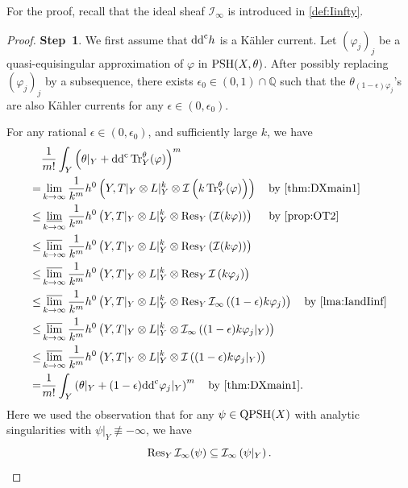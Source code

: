 For the proof, recall that the ideal sheaf $\mathcal{I}_{\infty}$ is introduced in \cref{def:Iinfty}.
\begin{proof}
\textbf{Step~1}. We first assume that $\mathrm{dd}^{\mathrm{c}} h$ is a Kähler current.
Let $(\varphi_j)_j$ be a quasi-equisingular approximation of $\varphi$ in $\mathrm{PSH}(X,\theta)$.
After possibly replacing $(\varphi_j)_j$ by a subsequence, there exists $\epsilon_0 \in (0,1)\cap \mathbb{Q}$ such that the $\theta_{(1-\epsilon) \varphi_j}$'s are also Kähler currents for any $\epsilon \in (0,\epsilon_0)$.

For any rational $\epsilon\in (0,\epsilon_0)$, and sufficiently large $k$, we have
\[
\begin{aligned}
&\frac{1}{m!}\int_Y \left(\theta|_Y+\ddc\Tr_Y^{\theta}(\varphi)\right)^m \\
=& \lim_{k \to \infty} \frac{1}{k^m} h^0\left(Y, T|_Y\otimes L|_Y^k\otimes \mathcal{I}\left(k\Tr_Y^{\theta}(\varphi)\right)\right) \quad \textup{by \cref{thm:DXmain1}}\\
\leq & \varliminf_{k \to \infty} \frac{1}{k^m} h^0\left(Y, T|_Y\otimes L|_Y^k\otimes \Rest_Y\left(\mathcal{I}(k\varphi)\right)\right) \quad \textup{ by \cref{prop:OT2}}\\
\leq & \varlimsup_{k \to \infty} \frac{1}{k^m} h^0\left(Y, T|_Y\otimes L|_Y^k\otimes \Rest_Y\left(\mathcal{I}(k\varphi)\right)\right)\\
\leq & \varlimsup_{k \to \infty} \frac{1}{k^m} h^0\left(Y, T|_Y\otimes L|_Y^k\otimes \Rest_Y\mathcal{I}\left(k\varphi_j\right)\right) \\
\leq & \varlimsup_{k \to \infty} \frac{1}{k^m} h^0\left(Y, T|_Y\otimes L|_Y^k\otimes \Rest_Y\mathcal{I}_{\infty}\left((1-\epsilon )k\varphi_j\right)\right)  \quad \textup{by \cref{lma:IandIinf}}\\
\leq & \varlimsup_{k \to \infty} \frac{1}{k^m} h^0\left(Y, T|_Y\otimes L|_Y^k\otimes \mathcal{I}_{\infty}\left((1-\epsilon )k\varphi_j|_Y\right)\right)\\
\leq & \varlimsup_{k \to \infty} \frac{1}{k^m} h^0\left(Y, T|_Y\otimes L|_Y^k\otimes \mathcal{I}\left((1-\epsilon) k\varphi_j|_Y\right) \right)\\
= & \frac{1}{m!} \int_Y \left(\theta|_Y+(1-\epsilon)\ddc\varphi_j|_Y\right)^m\quad \textup{by \cref{thm:DXmain1}}.
\end{aligned}
\]
Here we used the observation that for any $\psi\in \mathrm{QPSH}(X)$ with analytic singularities with $\psi|_Y\not\equiv -\infty$, we have
\[
\operatorname{Res}_Y \mathcal{I}_{\infty}(\psi)\subseteq \mathcal{I}_{\infty}\left(\psi|_Y\right).
\]


\end{proof}
